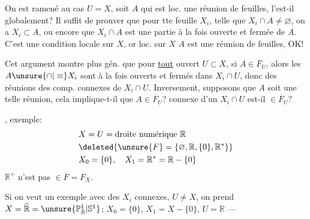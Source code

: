 On est ramené au cas $U=X$, soit $A$ qui est loc. une réunion de feuilles, l'est-il globalement? Il suffit de prouver que pour tte feuille $X_i$, telle que $X_i\cap A\ne\varnothing$, on a $X_i\subset A$, ou encore que $X_i\cap A$ est une partie à la fois ouverte et fermée de $A$. C'est une condition locale sur $X$, or loc. sur $X$ $A$ est  une réunion de feuilles, OK!

Cet argument montre plus gén. que pour \uline{tout} ouvert $U\subset X$, si $A\in\overline F_U$, alors les $A\unsure{\cap|\equiv} X_i$ sont à la fois ouverts et fermés dans $X_i\cap U$, donc des réunions des comp. connexes de $X_i\cap U$.  Inversement, supposons que $A$ soit une telle réunion, cela implique-t-il que $A\in\overline F_U$?  connexe d'un $X_i\cap U$ est-il $\in\overline F_U$?

, exemple:
\[
\begin{aligned}
&X=U=\text{droite numérique }\mathbb R\\
&\deleted{\unsure{F}=\{\varnothing,\mathbb R,\{0\},\mathbb R^*\}}\\
&X_0=\{0\},\quad X_1=\mathbb R^*=\mathbb R-\{0\}
\end{aligned}
\]
$\mathbb R^+$ n'est pas $\in\overline F=F_X$.


Si on veut un exemple avec des $X_i$ connexes, $U\ne X$, on prend $X=\widehat{\mathbb R}=\unsure{\mathbb P^1_{\mathbb R}|\mathbb S^1}$;  $X_0=\{0\}$, $X_1=X-\{0\}$, $U=\mathbb R$ ---
